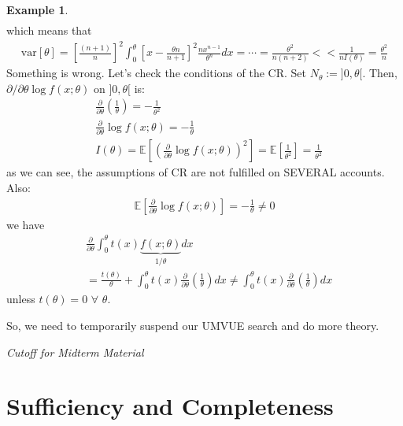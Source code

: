 \documentclass[11pt]{scrartcl}
\theoremstyle{definition}
\newtheorem{ex}{Example}
\theoremstyle{remark}
\newcommand{\EX}[1]{\mathbb{E}\left[#1 \right]}
\newcommand{\idx}[2]{\int_{#1}^{#2}}
\begin{document}
\begin{ex}
\begin{align*}
	\end{align*}
	which means that 
	\begin{align*}
		\text{var}[\theta] = \left[ 	 \frac{(n+1)}{n}	 \right]^2 \idx{0}{\theta} \left[ x - \frac{\theta n}{n+1}	\right]^2 \frac{nx^{n-1}}{\theta^n} dx   = \cdots = \frac{\theta^2}{n(n+2)} << \frac{1}{nI(\theta)} = \frac{\theta^2}{n}
	\end{align*}
	Something is wrong. Let's check the conditions of the CR. Set $N_\theta := ]0, \theta[$. Then, $\partial / \partial \theta \log f(x; \theta)$ on $]0, \theta[$ is: 
	\begin{align*}
		& \frac{\partial}{\partial \theta} \left( 	\frac{1}{\theta}	\right) = - \frac{1}{\theta^2} \\
		& \frac{\partial}{\partial \theta} \log f(x; \theta) = - \frac{1}{\theta} \\
		& I(\theta) = \EX{ \left( 	\frac{\partial}{\partial \theta} \log f(x; \theta)	 \right)^2  } = \EX{\frac{1}{\theta^2}}  = \frac{1}{\theta^2}
	\end{align*}
	as we can see, the assumptions of CR are not fulfilled on SEVERAL accounts. Also: 
	\begin{align*}
		\EX{\frac{\partial}{\partial \theta} \log f(x; \theta)} = - \frac{1}{\theta} \neq 0 
	\end{align*}
	we have 
	\begin{align*}
		& \frac{\partial}{\partial \theta} \idx{0}{\theta} t(x) \underbrace{f(x; \theta)}_{1/ \theta} dx \\
		& = \frac{t(\theta)}{\theta} + \idx{0}{\theta} t(x) \frac{\partial}{\partial \theta} \left( \frac{1}{\theta} \right) dx \neq \idx{0}{\theta} t(x) \frac{\partial}{\partial \theta} \left( \frac{1}{\theta} \right) dx 
	\end{align*}
	unless $t(\theta) = 0$ $\forall$ $\theta$. 
\end{ex}

So, we need to temporarily suspend our UMVUE search and do more theory.

\emph{Cutoff for Midterm Material} 
\section{Sufficiency and Completeness} 
\end{document}
